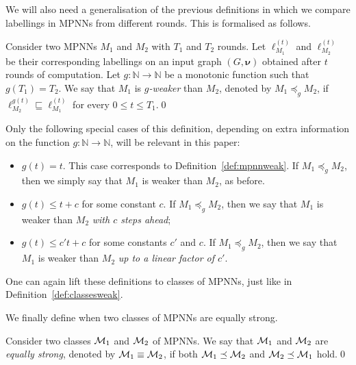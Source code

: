 We will also need a generalisation of the previous definitions in which we compare labellings in MPNNs from different rounds. 
This is formalised as follows.

\begin{definition}\normalfont
Consider two MPNNs $M_1$ and $M_2$ with $T_1$ and $T_2$ rounds. Let $\pmb{\ell}_{M_1}^{(t)}$ and $\pmb{\ell}_{M_2}^{(t)}$  be their corresponding labellings on an input graph $( G,\pmb{\nu})$ obtained after $t$ rounds of computation. Let $g:\mathbb{N}\to \mathbb{N}$ be a monotonic function such that $g(T_1) = T_2$. We say that $M_1$ is \textit{$g$-weaker} than $M_2$, denoted by $M_1\preceq_{g} M_2$, if 
$\pmb{\ell}_{M_2}^{g(t)}\sqsubseteq
\pmb{\ell}_{M_1}^{(t)}$ for every $0 \le t\le T_1$.\qed
\end{definition}

Only the following special cases of this definition, depending on extra information on the function $g:\mathbb{N}\to\mathbb{N}$, will be relevant in this paper:
\begin{itemize}
    \item $g(t)=t$. This case corresponds to Definition~\ref{def:mpnnweak}. If $M_1\preceq_{g} M_2$, then we simply say that $M_1$ is weaker than $M_2$, as before.
    \item $g(t)\leq t+c$ for some constant $c$. If $M_1\preceq_{g} M_2$, then we say that $M_1$ is weaker than $M_2$ \textit{with $c$ steps ahead};
    \item $g(t)\leq c't+c$ for some constants $c'$ and $c$. If $M_1\preceq_{g} M_2$, then we say that $M_1$ is weaker than $M_2$ \textit{up to a linear factor of $c'$}.
\end{itemize}


One can again lift these definitions to classes of MPNNs, just like in Definition~\ref{def:classesweak}.

We finally define when two classes of MPNNs are equally strong.
\begin{definition}\normalfont
Consider two classes $\mathcal{M}_1$ and $\mathcal{M}_2$ of MPNNs. We say that 
$\mathcal{M}_1$ and $\mathcal{M}_2$ are \textit{equally strong}, denoted by $\mathcal{M}_1\equiv \mathcal{M}_2$, if 
both  $\mathcal{M}_1\preceq \mathcal{M}_2$ 
and  $\mathcal{M}_2\preceq \mathcal{M}_1$ hold.\qed\end{definition}


